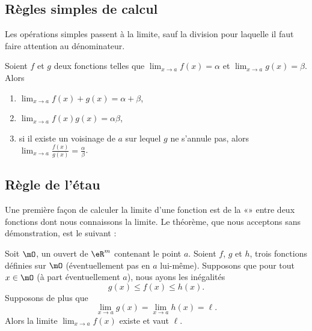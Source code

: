 \subsection{Règles simples de calcul}

Les opérations simples passent à la limite, sauf la division pour laquelle il faut faire attention au dénominateur.
\begin{proposition}     \label{PropOpsSimplesLimites}
    Soient \( f\) et \( g\) deux fonctions telles que \( \lim_{x\to a} f(x)=\alpha\) et \( \lim_{x\to a} g(x)=\beta\). Alors
    \begin{enumerate}
        \item
            \( \lim_{x\to a} f(x)+g(x)=\alpha+\beta\),
        \item
            \( \lim_{x\to a} f(x)g(x)=\alpha\beta\),
        \item
            si il existe un voisinage de \( a\) sur lequel \( g\) ne s'annule pas, alors \( \lim_{x\to a} \frac{ f(x) }{ g(x) }=\frac{ \alpha }{ \beta }\).
    \end{enumerate}
\end{proposition}

\subsection{Règle de l'étau}

Une première façon de calculer la limite d'une fonction est de la «» entre deux fonctions dont nous connaissons la limite. Le théorème, que nous acceptons sans démonstration, est le suivant :
\begin{theorem}		\label{ThoRegleEtau}
	Soit $\mO$, un ouvert de $\eR^m$ contenant le point $a$. Soient $f$, $g$ et $h$, trois fonctions définies sur $\mO$ (éventuellement pas en $a$ lui-même). Supposons que pour tout $x\in\mO$ (à part éventuellement $a$), nous ayons les inégalités
	\begin{equation}
		g(x)\leq f(x)\leq h(x).
	\end{equation}
	Supposons de plus que
	\begin{equation}
		\lim_{x\to a} g(x)=\lim_{x\to a} h(x)=\ell.
	\end{equation}
	Alors la limite $\lim_{x\to a} f(x)$ existe et vaut $\ell$.
\end{theorem}

